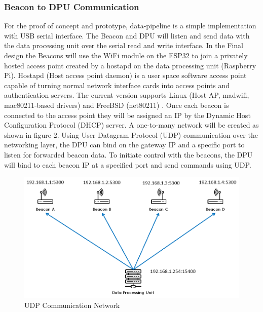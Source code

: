 \pagebreak
\subsubsection{Beacon to DPU Communication}
\medskip
For the proof of concept and prototype, data-pipeline is a simple implementation with USB serial interface. The Beacon and DPU will listen and send data with the data processing unit over the serial read and write interface. In the Final design the Beacons will use the WiFi module on the ESP32 to join a privately hosted access point created by a hostapd on the data processing unit (Raspberry Pi). Hostapd (Host access point daemon) is a user space software access point capable of turning normal network interface cards into access points and authentication servers. The current version supports Linux (Host AP, madwifi, mac80211-based drivers) and FreeBSD (net80211) \cite{R4-1-2-1}. Once each beacon is connected to the access point they will be assigned an IP by the Dynamic Host Configuration Protocol (DHCP) server. A one-to-many network will be created as shown in figure 2. Using User Datagram Protocol (UDP) communication over the networking layer, the DPU can bind on the gateway IP and a specific port to listen for forwarded beacon data. To initiate control with the beacons, the DPU will bind to each beacon IP at a specified port and send commands using UDP.

\medskip
\begin{figure}[H]
\centering
    \includegraphics[width=\linewidth]{./images/UDP.png}
    \caption{UDP Communication Network}
    \label{udp}
\end{figure}
\medskip



\pagebreak
